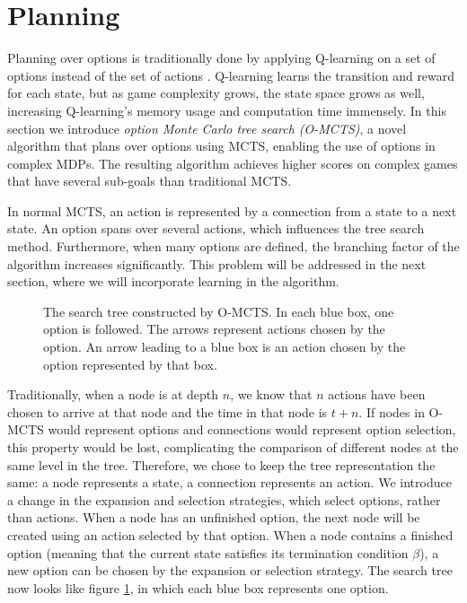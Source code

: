 \section{Planning}
\label{sec:planning}


Planning over options is traditionally done by applying Q-learning on a set of
options instead of the set of actions \cite{sutton1999between}. Q-learning
learns the transition and reward for each state, but as game complexity grows,
the state space grows as well, increasing Q-learning's memory usage and
computation time immensely. In this section we introduce \emph{option Monte
Carlo tree search (O-MCTS)}, a novel algorithm that plans over options using
MCTS, enabling the use of options in complex MDPs.  The resulting algorithm
achieves higher scores on complex games that have several sub-goals than
traditional MCTS.

In normal MCTS, an action is represented by a connection from a state to a next
state. An option spans over several actions, which influences the tree search
method. Furthermore, when many options are defined, the branching factor of the
algorithm increases significantly. This problem will be addressed in the next
section, where we will incorporate learning in the algorithm.

\begin{figure}
	\centering
	\caption{The search tree constructed by O-MCTS. In each blue box, one option
	is followed. The arrows represent actions chosen by the option. An arrow
leading to a blue box is an action chosen by the option represented by that box.}
	\label{fig:omcts-tree}
\end{figure}

Traditionally, when a node is at depth $n$, we know that $n$ actions have been
chosen to arrive at that node and the time in that node is $t+n$. If nodes in
O-MCTS would represent options and connections would represent option selection,
this property would be lost, complicating the comparison of different nodes at
the same level in the tree. Therefore, we chose to keep the tree representation
the same: a node represents a state, a connection represents an action. We
introduce a change in the expansion and selection strategies, which select
options, rather than actions. When a node has an unfinished option, the next
node will be created using an action selected by that option. When a node
contains a finished option (meaning that the current state satisfies its
termination condition $\beta$), a new option can be chosen by the expansion or
selection strategy. The search tree now looks like figure \ref{fig:omcts-tree},
in which each blue box represents one option.

